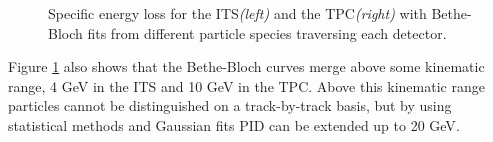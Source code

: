 \begin{figure}[h]
   \centering
   \caption{Specific energy loss for the ITS\textit{(left)} and the TPC\textit{(right)} with Bethe-Bloch fits from different particle species traversing each detector\cite{Noferini:2016lcw}.}
   \label{fig:multipart-ALICE}
\end{figure}

Figure \ref{fig:multipart-ALICE} also shows that the Bethe-Bloch curves merge above some kinematic range, 4 GeV in the ITS and 10 GeV in the TPC.  Above this kinematic range particles cannot be distinguished on a track-by-track basis, but by using statistical methods and Gaussian fits PID can be extended up to 20 GeV\cite{Abelev:2014laa}.
